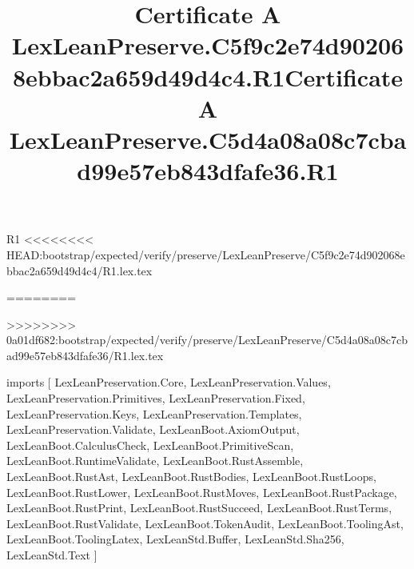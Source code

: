 \begin{lexlean}{R1}
<<<<<<<< HEAD:bootstrap/expected/verify/preserve/LexLeanPreserve/C5f9c2e74d902068ebbac2a659d49d4c4/R1.lex.tex
\title{Certificate A LexLeanPreserve.C5f9c2e74d902068ebbac2a659d49d4c4.R1}
========
\title{Certificate A LexLeanPreserve.C5d4a08a08c7cbad99e57eb843dfafe36.R1}
>>>>>>>> 0a01df682:bootstrap/expected/verify/preserve/LexLeanPreserve/C5d4a08a08c7cbad99e57eb843dfafe36/R1.lex.tex
\begin{coremodule}
imports [
  LexLeanPreservation.Core,
  LexLeanPreservation.Values,
  LexLeanPreservation.Primitives,
  LexLeanPreservation.Fixed,
  LexLeanPreservation.Keys,
  LexLeanPreservation.Templates,
  LexLeanPreservation.Validate,
  LexLeanBoot.AxiomOutput,
  LexLeanBoot.CalculusCheck,
  LexLeanBoot.PrimitiveScan,
  LexLeanBoot.RuntimeValidate,
  LexLeanBoot.RustAssemble,
  LexLeanBoot.RustAst,
  LexLeanBoot.RustBodies,
  LexLeanBoot.RustLoops,
  LexLeanBoot.RustLower,
  LexLeanBoot.RustMoves,
  LexLeanBoot.RustPackage,
  LexLeanBoot.RustPrint,
  LexLeanBoot.RustSucceed,
  LexLeanBoot.RustTerms,
  LexLeanBoot.RustValidate,
  LexLeanBoot.TokenAudit,
  LexLeanBoot.ToolingAst,
  LexLeanBoot.ToolingLatex,
  LexLeanStd.Buffer,
  LexLeanStd.Sha256,
  LexLeanStd.Text
]


\end{coremodule}
\end{lexlean}
